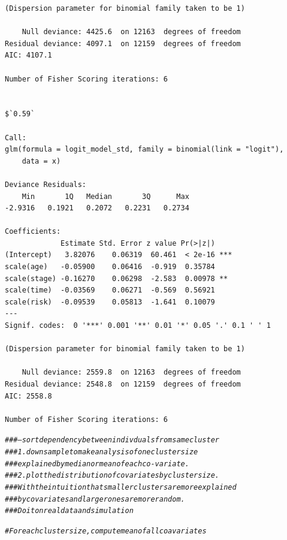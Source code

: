 \documentclass[]{revtex4}\usepackage[]{graphicx}\usepackage[]{color}
\makeatletter
\newcommand{\hlcom}[1]{\textcolor[rgb]{0.678,0.584,0.686}{\textit{#1}}}%
\newenvironment{kframe}{%
 \def\at@end@of@kframe{}%
 \ifinner\ifhmode%
  \def\at@end@of@kframe{\end{minipage}}%
  \begin{minipage}{\columnwidth}%
 \fi\fi%
 \def\FrameCommand##1{\hskip\@totalleftmargin \hskip-\fboxsep
 \colorbox{shadecolor}{##1}\hskip-\fboxsep
     \hskip-\linewidth \hskip-\@totalleftmargin \hskip\columnwidth}%
 \MakeFramed {\advance\hsize-\width
   \@totalleftmargin\z@ \linewidth\hsize
   \@setminipage}}%
 {\par\unskip\endMakeFramed%
 \at@end@of@kframe}
\newenvironment{knitrout}{}{} %
\makeatother
\begin{document}
\begin{knitrout}
\begin{kframe}
\begin{verbatim}
(Dispersion parameter for binomial family taken to be 1)

    Null deviance: 4425.6  on 12163  degrees of freedom
Residual deviance: 4097.1  on 12159  degrees of freedom
AIC: 4107.1

Number of Fisher Scoring iterations: 6


$`0.59`

Call:
glm(formula = logit_model_std, family = binomial(link = "logit"), 
    data = x)

Deviance Residuals: 
    Min       1Q   Median       3Q      Max  
-2.9316   0.1921   0.2072   0.2231   0.2734  

Coefficients:
             Estimate Std. Error z value Pr(>|z|)    
(Intercept)   3.82076    0.06319  60.461  < 2e-16 ***
scale(age)   -0.05900    0.06416  -0.919  0.35784    
scale(stage) -0.16270    0.06298  -2.583  0.00978 ** 
scale(time)  -0.03569    0.06271  -0.569  0.56921    
scale(risk)  -0.09539    0.05813  -1.641  0.10079    
---
Signif. codes:  0 '***' 0.001 '**' 0.01 '*' 0.05 '.' 0.1 ' ' 1

(Dispersion parameter for binomial family taken to be 1)

    Null deviance: 2559.8  on 12163  degrees of freedom
Residual deviance: 2548.8  on 12159  degrees of freedom
AIC: 2558.8

Number of Fisher Scoring iterations: 6
\end{verbatim}
\begin{alltt}
\hlcom{###--- sort dependency between indivduals from same cluster}
\hlcom{### 1. downsample to make analysis of one cluster size}
\hlcom{###  explained by median or mean of each co-variate.}
\hlcom{###  2. plot the distribution of covariates by cluster size. }
\hlcom{###  With the intuition that smaller clusters are more explained}
\hlcom{###  by covariates and larger ones are more random. }
\hlcom{###  Do it on real data and simulation}

\hlcom{# For each cluster size, compute mean of all coavariates}
\end{alltt}
\end{kframe}
\end{knitrout}
\end{document}
